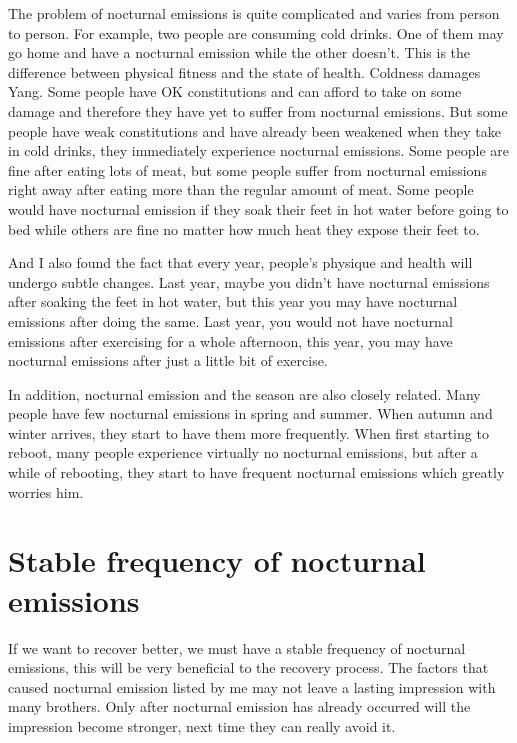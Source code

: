 \documentclass[
]{book}
\begin{document}
The problem of nocturnal emissions is quite complicated and varies from person to person. For example, two people are consuming cold drinks. One of them may go home and have a nocturnal emission while the other doesn't. This is the difference between physical fitness and the state of health. Coldness damages Yang. Some people have OK constitutions and can afford to take on some damage and therefore they have yet to suffer from nocturnal emissions. But some people have weak constitutions and have already been weakened when they take in cold drinks, they immediately experience nocturnal emissions. Some people are fine after eating lots of meat, but some people suffer from nocturnal emissions right away after eating more than the regular amount of meat. Some people would have nocturnal emission if they soak their feet in hot water before going to bed while others are fine no matter how much heat they expose their feet to.

And I also found the fact that every year, people's physique and health will undergo subtle changes. Last year, maybe you didn't have nocturnal emissions after soaking the feet in hot water, but this year you may have nocturnal emissions after doing the same. Last year, you would not have nocturnal emissions after exercising for a whole afternoon, this year, you may have nocturnal emissions after just a little bit of exercise.

In addition, nocturnal emission and the season are also closely related. Many people have few nocturnal emissions in spring and summer. When autumn and winter arrives, they start to have them more frequently. When first starting to reboot, many people experience virtually no nocturnal emissions, but after a while of rebooting, they start to have frequent nocturnal emissions which greatly worries him.

\hypertarget{stable-frequency-of-nocturnal-emissions}{%
\section{Stable frequency of nocturnal emissions}\label{stable-frequency-of-nocturnal-emissions}}

If we want to recover better, we must have a stable frequency of nocturnal emissions, this will be very beneficial to the recovery process. The factors that caused nocturnal emission listed by me may not leave a lasting impression with many brothers. Only after nocturnal emission has already occurred will the impression become stronger, next time they can really avoid it.
\end{document}
